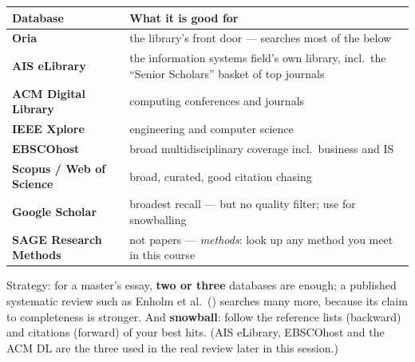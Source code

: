 \documentclass[11pt,a4paper,british,twoside=false,headings=small,chapterprefix=false,numbers=noenddot]{scrbook}
\begin{document}
\begin{center}\small
\footnotesize
  \renewcommand{\arraystretch}{1.22}
  \begin{tabular}{@{}p{4.2cm}p{9.0cm}@{}}
    \toprule
    \textbf{Database} & \textbf{What it is good for}\\
    \midrule
    \textbf{Oria} & the library's front door --- searches most of the below\\
    \textbf{AIS eLibrary} & the information systems field's own library, incl.\ the ``Senior Scholars'' basket of top journals\\
    \textbf{ACM Digital Library} & computing conferences and journals\\
    \textbf{IEEE Xplore} & engineering and computer science\\
    \textbf{EBSCOhost} & broad multidisciplinary coverage incl.\ business and IS\\
    \textbf{Scopus / Web of Science} & broad, curated, good citation chasing\\
    \textbf{Google Scholar} & broadest recall --- but no quality filter; use for snowballing\\
    \textbf{SAGE Research Methods} & not papers --- \emph{methods}: look up any method you meet in this course\\
    \bottomrule
  \end{tabular}
  

  Strategy: for a master's essay, \textbf{two or three} databases are enough;
  a published systematic review such as Enholm et al.\ () searches
  many more, because its claim to completeness is stronger. And \textbf{snowball}: follow the reference lists (backward) and citations
  (forward) of your best hits. {\color{kgrey}(AIS eLibrary, EBSCOhost and the
  ACM DL are the three used in the real review later in this session.)}
\end{center}
\end{document}
